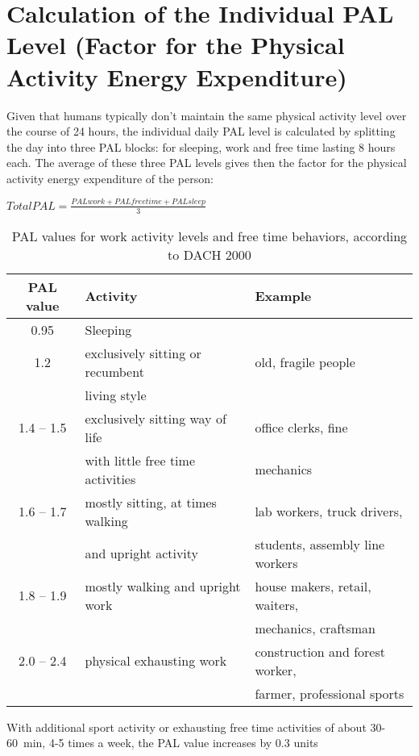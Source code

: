 \documentclass[../main.tex]{subfiles}
\begin{document}
\section[Calculation of the Individual PAL Level]{Calculation of the Individual PAL Level (Factor for the Physical Activity Energy Expenditure)}

Given that humans typically don't maintain the same physical activity level over the course of 24 hours, the individual daily PAL level is calculated by splitting the day into three PAL blocks: for sleeping, work and free time lasting 8 hours each.
The average of these three PAL levels gives then the factor for the physical activity energy expenditure of the person:

\vspace{2mm}

\begin{center}
\begin{fminipage}{7cm}
$ Total PAL = \frac{PAL work + PAL free time + PAL sleep}{3}$ 
\end{fminipage}
\end{center}

\vspace{2mm}

\begin{table}[htb]
  \centering
  \begin{tabular}{cll}
    \textbf{PAL value} & \textbf{Activity} & \textbf{Example} \\
    \hline
    0.95 & Sleeping \\
    1.2 & exclusively sitting or recumbent & old, fragile people \\
    & living style \\
    1.4 -- 1.5 & exclusively sitting way of life & office clerks, fine \\
              & with little free time activities  & mechanics \\
    1.6 -- 1.7& mostly sitting, at times walking& lab workers, truck drivers, \\
              & and upright activity & students, assembly line workers\\
    1.8 -- 1.9 & mostly walking and upright work & house makers, retail, waiters,\\
              & & mechanics, craftsman\\
    2.0 -- 2.4 & physical exhausting work & construction and forest worker, \\
    & & farmer, professional sports\\
  \end{tabular}
  \vspace{1mm}
  
  \noindent With additional sport activity or exhausting free time activities of about 30-60~min, 4-5 times a week, the PAL value increases by 0.3 units
  \caption{PAL values for work activity levels and free time behaviors, according to DACH 2000}
\end{table}
\end{document}
